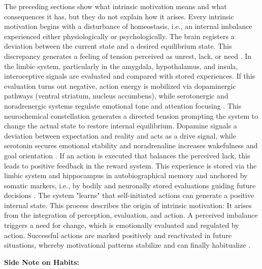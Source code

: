 The preceding sections show what intrinsic motivation means and what consequences it has, but they do not explain how it arises.
Every intrinsic motivation begins with a disturbance of homeostasis, i.e., an internal imbalance experienced either physiologically or psychologically.
The brain registers a deviation between the current state and a desired equilibrium state.
This discrepancy generates a feeling of tension perceived as unrest, lack, or need \cite{Friston2010, CarverScheier1998}.
In the limbic system, particularly in the amygdala, hypothalamus, and insula, interoceptive signals are evaluated and compared with stored experiences.
If this evaluation turns out negative, action energy is mobilized via dopaminergic pathways (ventral striatum, nucleus accumbens), while serotonergic and noradrenergic systems regulate emotional tone and attention focusing \cite{LeDoux1996, Panksepp1998}.
This neurochemical constellation generates a directed tension prompting the system to change the actual state to restore internal equilibrium.
Dopamine signals a deviation between expectation and reality and acts as a drive signal, while serotonin secures emotional stability and noradrenaline increases wakefulness and goal orientation \cite{Schultz1997, AstonJones2005, Cools2008}.
If an action is executed that balances the perceived lack, this leads to positive feedback in the reward system.
This experience is stored via the limbic system and hippocampus in autobiographical memory and anchored by somatic markers, i.e., by bodily and neuronally stored evaluations guiding future decisions \cite{Damasio1994, Damasio1999}.
The system "learns" that self-initiated actions can generate a positive internal state.
This process describes the origin of intrinsic motivation: It arises from the integration of perception, evaluation, and action.
A perceived imbalance triggers a need for change, which is emotionally evaluated and regulated by action.
Successful actions are marked positively and reactivated in future situations, whereby motivational patterns stabilize and can finally habitualize \cite{Hebb1949, Graybiel2008, YinKnowlton2006}.

\textbf{Side Note on Habits:}

